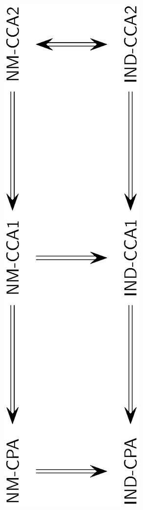 \documentclass[landscape,footrule]{foils}
\begin{document}
\begin{center}
  \includegraphics[scale=0.82, angle=-90, clip, trim=3.5cm 2.5cm 11.1cm
  2.5cm]{homological-classification.eps}
\end{center}
\end{document}
